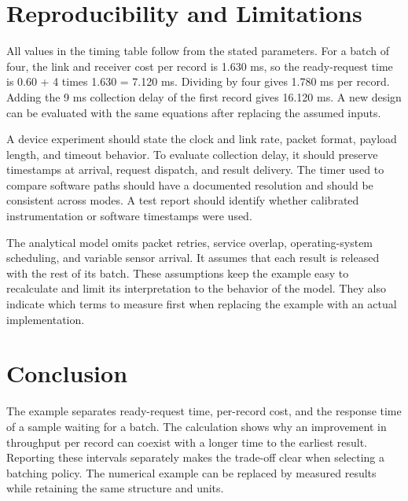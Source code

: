\section{Reproducibility and Limitations}

All values in the timing table follow from the stated parameters. For a batch of four, the link and receiver cost per record is 1.630 ms, so the ready-request time is 0.60 + 4 times 1.630 = 7.120 ms. Dividing by four gives 1.780 ms per record. Adding the 9 ms collection delay of the first record gives 16.120 ms. A new design can be evaluated with the same equations after replacing the assumed inputs.

A device experiment should state the clock and link rate, packet format, payload length, and timeout behavior. To evaluate collection delay, it should preserve timestamps at arrival, request dispatch, and result delivery. The timer used to compare software paths should have a documented resolution and should be consistent across modes. A test report should identify whether calibrated instrumentation or software timestamps were used.

\SampleColumnBreak

The analytical model omits packet retries, service overlap, operating-system scheduling, and variable sensor arrival. It assumes that each result is released with the rest of its batch. These assumptions keep the example easy to recalculate and limit its interpretation to the behavior of the model. They also indicate which terms to measure first when replacing the example with an actual implementation.

\section{Conclusion}

The example separates ready-request time, per-record cost, and the response time of a sample waiting for a batch. The calculation shows why an improvement in throughput per record can coexist with a longer time to the earliest result. Reporting these intervals separately makes the trade-off clear when selecting a batching policy. The numerical example can be replaced by measured results while retaining the same structure and units.
